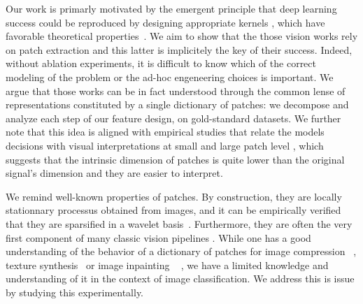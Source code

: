 \documentclass{article}
\begin{document}
Our work is primarly motivated by the emergent principle that  deep learning success  could be reproduced by   designing appropriate kernels \citep{mairal2016end,li2019enhanced,shankar2020neural,lu2014scale}, which have favorable theoretical properties~\citep{jacot2018neural,rahimi2008random}. We aim to show that  the those vision works rely on patch extraction and this latter is implicitely the key of their success.  Indeed, without ablation experiments, it is difficult to know which of  the correct modeling of the problem or  the ad-hoc engeneering choices is important. We argue that those works can be in fact understood through the common  lense of representations constituted by a single dictionary of patches: we decompose and analyze each step of our feature design, on gold-standard  datasets. We further note that this idea is aligned with empirical studies that relate the models decisions with visual interpretations at small and large patch level
\citep{zeiler2014visualizing,brendel2019approximating}, which suggests that the intrinsic dimension of patches is quite  lower than the original signal's dimension and they are easier to interpret.



We remind well-known properties of patches. By construction,  they are locally stationnary processus obtained from images, and it can be empirically verified that they are sparsified in a wavelet basis~\citep{mallat1999wavelet}. Furthermore, they are often the very first component of many classic vision pipelines \citep{perronnin2010improving,lowe2004distinctive,brendel2019approximating,oyallon2018scattering}. While one has a good understanding of the behavior of a dictionary of patches for image compression
~\citep{wallace1992jpeg}, texture synthesis~\citep{efros1999texture} or image inpainting ~\citep{criminisi2004region} , we have a limited knowledge and understanding of it in the context of image classification. We address this is issue by studying this experimentally.
\end{document}
